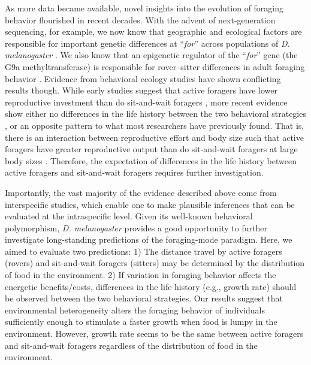 \documentclass[12pt]{article}
\begin{document}
\vspace{20px}

As more data became available, novel insights into the evolution of foraging behavior flourished in recent decades. With the advent of next-generation sequencing, for example, we now know that geographic and ecological factors are responsible for important genetic differences at ``\textit{for}'' across populations of \textit{D. melanogaster} \citep{padilla2024geographic}. We also know that an epigenetic regulator of the ``\textit{for}'' gene (the G9a methyltransferase) is responsible for rover–sitter differences in adult foraging behavior \citep{anreiter2017epigenetic}. Evidence from behavioral ecology studies have shown conflicting results though. While early studies suggest that active foragers have lower reproductive investment than do sit-and-wait foragers \citep{vitt1978body,vitt1982ecological}, more recent evidence show either no differences in the life history between the two behavioral strategies \citep{mesquita2016life}, or an opposite pattern to what most researchers have previously found. That is, there is an interaction between reproductive effort and body size such that active foragers have greater reproductive output than do sit-and-wait foragers at large body sizes \citep{padilla2022correlated}. Therefore, the expectation of differences in the life history between active foragers and sit-and-wait foragers requires further investigation.

\vspace{20px}

Importantly, the vast majority of the evidence described above come from interspecific studies, which enable one to make plausible inferences that can be evaluated at the intraspecific level. Given its well-known behavioral polymorphism, \textit{D. melanogaster} provides a good opportunity to further investigate long-standing predictions of the foraging-mode paradigm. Here, we aimed to evaluate two predictions: 1) The distance travel by active foragers (rovers) and sit-and-wait foragers (sitters) may be determined by the distribution of food in the environment. 2) If variation in foraging behavior affects the energetic benefits/costs, differences in the life history (e.g., growth rate) should be observed between the two behavioral strategies. Our results suggest that environmental heterogeneity alters the foraging behavior of individuals sufficiently enough to stimulate a faster growth when food is lumpy in the environment. However, growth rate seems to be the same between active foragers and sit-and-wait foragers regardless of the distribution of food in the environment.
\end{document}
